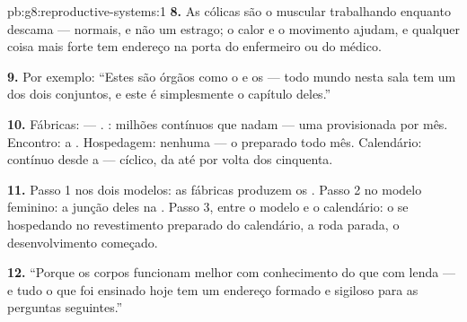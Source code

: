 \begin{solution}{pb:g8:reproductive-systems:1}
\textbf{8.} As cólicas são o  muscular trabalhando enquanto
descama --- normais, e não um estrago; o calor e o movimento ajudam, e
qualquer coisa mais forte tem endereço na porta do enfermeiro ou do
médico.

\textbf{9.} Por exemplo: ``Estes são órgãos como o  e os
 --- todo mundo nesta sala tem um dos dois conjuntos, e este é
simplesmente o capítulo deles.''

\textbf{10.} Fábricas:  --- . : milhões
contínuos que nadam --- uma  provisionada por mês. Encontro: a
. Hospedagem: nenhuma --- o  preparado todo mês.
Calendário: contínuo desde a  --- cíclico, da  até
por volta dos cinquenta.

\textbf{11.} Passo 1 nos dois modelos: as fábricas produzem os
. Passo 2 no modelo feminino: a junção deles na .
Passo 3, entre o modelo e o calendário: o  se hospedando no
revestimento preparado do calendário, a roda parada, o desenvolvimento
começado.

\textbf{12.} ``Porque os corpos funcionam melhor com conhecimento do
que com lenda --- e tudo o que foi ensinado hoje tem um endereço
formado e sigiloso para as perguntas seguintes.''
\end{solution}
